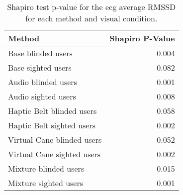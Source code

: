
\begin{table}[!htb]
\centering
\caption{Shapiro test p-value for the ecg average RMSSD for each method and visual condition.}
\label{tab:shapiro_ecg_rmssd}
\begin{tabular}{lr}
\toprule
                    Method &  Shapiro P-Value \\
\midrule
        Base blinded users &            0.004 \\
        Base sighted users &            0.082 \\
       Audio blinded users &            0.001 \\
       Audio sighted users &            0.008 \\
 Haptic Belt blinded users &            0.058 \\
 Haptic Belt sighted users &            0.002 \\
Virtual Cane blinded users &            0.052 \\
Virtual Cane sighted users &            0.002 \\
     Mixture blinded users &            0.015 \\
     Mixture sighted users &            0.001 \\
\bottomrule
\end{tabular}
\end{table}

